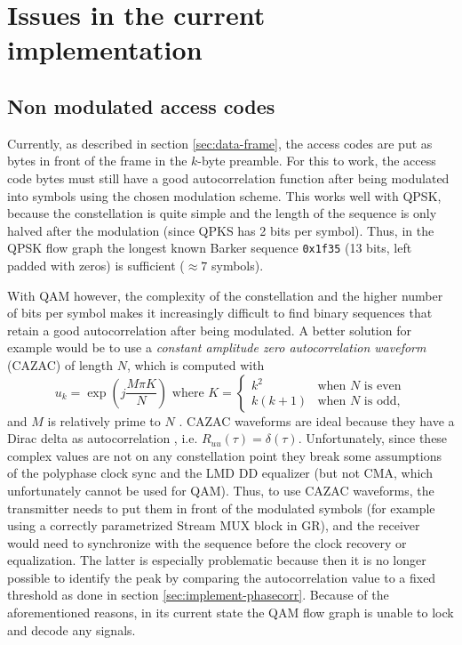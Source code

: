 \section{Issues in the current implementation}

\subsection{Non modulated access codes} \label{sec:access-code-issue}

Currently, as described in section \ref{sec:data-frame}, the access codes are put as bytes in front of the frame in the \(k\)-byte preamble. For this to work, the access code bytes must still have a good autocorrelation function after being modulated into symbols using the chosen modulation scheme. This works well with QPSK, because the constellation is quite simple and the length of the sequence is only halved after the modulation (since QPKS has 2 bits per symbol). Thus, in the QPSK flow graph the longest known Barker sequence  \texttt{0x1f35} (13 bits, left padded with zeros) is sufficient (\(\approx 7\) symbols).

With QAM however, the complexity of the constellation and the higher number of bits per symbol makes it increasingly difficult to find binary sequences that retain a good autocorrelation after being modulated. A better solution for example would be to use a \emph{constant amplitude zero autocorrelation waveform} (CAZAC) of length \(N\), which is computed with
\begin{equation}
	u_k = \exp\left(j\frac{M\pi K}{N}\right) \text{ where }
	K = \begin{cases}
		k^2 & \text{when } N \text{ is even} \\
		k(k+1) & \text{when } N \text{ is odd},
	\end{cases}
\end{equation}
and \(M\) is relatively prime to \(N\) \cite{Chu1972}. CAZAC waveforms are ideal because they have a Dirac delta as autocorrelation \cite{Chu1972}, i.e. \(R_{uu}(\tau) = \delta(\tau)\). Unfortunately, since these complex values are not on any constellation point they break some assumptions of the polyphase clock sync and the LMD DD equalizer (but not CMA, which unfortunately cannot be used for QAM). Thus, to use CAZAC waveforms, the transmitter needs to put them in front of the modulated symbols (for example using a correctly parametrized Stream MUX block in GR), and the receiver would need to synchronize with the sequence before the clock recovery or equalization. The latter is especially problematic because then it is no longer possible to identify the peak by comparing the autocorrelation value to a fixed threshold as done in section \ref{sec:implement-phasecorr}. Because of the aforementioned reasons, in its current state the QAM flow graph is unable to lock and decode any signals.



